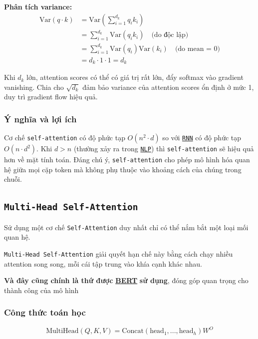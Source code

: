 \textbf{Phân tích variance:}
\begin{align}
\text{Var}(q \cdot k) &= \text{Var}\left(\sum_{i=1}^{d_k} q_i k_i\right) \\
&= \sum_{i=1}^{d_k} \text{Var}(q_i k_i) \quad \text{(do độc lập)} \\
&= \sum_{i=1}^{d_k} \text{Var}(q_i)\text{Var}(k_i) \quad \text{(do mean = 0)} \\
&= d_k \cdot 1 \cdot 1 = d_k
\end{align}

Khi $d_k$ lớn, attention scores có thể có giá trị rất lớn, đẩy softmax vào gradient vanishing. Chia cho $\sqrt{d_k}$ đảm bảo variance của attention scores ổn định ở mức 1, duy trì gradient flow hiệu quả.

\subsubsection{Ý nghĩa và lợi ích}
Cơ chế \texttt{self-attention} có độ phức tạp $O(n^2 \cdot d)$ so với \hyperref[acro:rnn]{\texttt{RNN}} có độ phức tạp $O(n \cdot d^2)$. Khi $d > n$ (thường xảy ra trong \hyperref[acro:nlp]{\texttt{NLP}}) thì \texttt{self-attention} sẽ hiệu quả hơn về mặt tính toán. Đáng chú ý, \texttt{self-attention} cho phép mô hình hóa quan hệ giữa mọi cặp token mà không phụ thuộc vào khoảng cách của chúng trong chuỗi.

\subsection{\texttt{Multi-Head Self-Attention}}
\label{ssec:multi_head_attention}

Sử dụng một cơ chế \texttt{Self-Attention} duy nhất chỉ có thể nắm bắt một loại mối quan hệ. 

\texttt{Multi-Head Self-Attention} giải quyết hạn chế này bằng cách chạy nhiều attention song song, mỗi cái tập trung vào khía cạnh khác nhau.

\textbf{Và đây cũng chính là thứ được} \hyperref[acro:bert]{\textbf{BERT}} \textbf{sử dụng}, đóng góp quan trọng cho thành công của mô hình

\subsubsection{Công thức toán học}
\begin{equation}
\text{MultiHead}(Q, K, V) = \text{Concat}(\text{head}_1, ..., \text{head}_h)W^O
\label{eq:multihead}
\end{equation}

